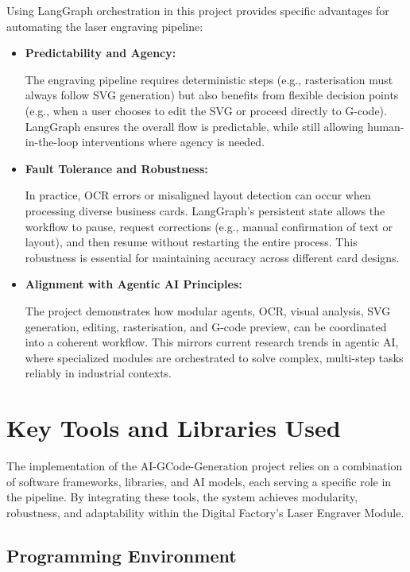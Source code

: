 Using LangGraph orchestration in this project provides specific advantages for automating the laser engraving pipeline:
\begin{itemize}
\item \textbf{Predictability and Agency:}

The engraving pipeline requires deterministic steps (e.g., rasterisation must always follow SVG generation) but also benefits from flexible decision points (e.g., when a user chooses to edit the SVG or proceed directly to G-code). LangGraph ensures the overall flow is predictable, while still allowing human-in-the-loop interventions where agency is needed.

\item \textbf{Fault Tolerance and Robustness:}

In practice, OCR errors or misaligned layout detection can occur when processing diverse business cards. LangGraph’s persistent state allows the workflow to pause, request corrections (e.g., manual confirmation of text or layout), and then resume without restarting the entire process. This robustness is essential for maintaining accuracy across different card designs.

\item \textbf{Alignment with Agentic AI Principles:}

The project demonstrates how modular agents, OCR, visual analysis, SVG generation, editing, rasterisation, and G-code preview, can be coordinated into a coherent workflow. This mirrors current research trends in agentic AI, where specialized modules are orchestrated to solve complex, multi-step tasks reliably in industrial contexts.
\end{itemize}

\section{Key Tools and Libraries Used}

The implementation of the AI-GCode-Generation project relies on a combination of software frameworks, libraries, and AI models, each serving a specific role in the pipeline. By integrating these tools, the system achieves modularity, robustness, and adaptability within the Digital Factory’s Laser Engraver Module.

\subsection{Programming Environment}


